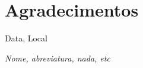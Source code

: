 \chapter*{Agradecimentos}

\lipsum[1]

\vspace{15mm}

\begin{minipage}{.45\linewidth}
    \begin{flushleft}
        Data, Local
    \end{flushleft}
\end{minipage}
\begin{minipage}{.45\linewidth}
    \begin{flushright}
        \textit{Nome, abreviatura, nada, etc}
    \end{flushright}
\end{minipage}